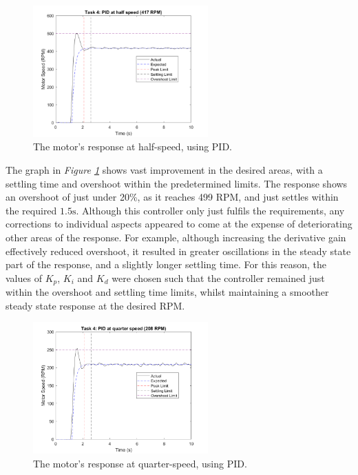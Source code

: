 \documentclass[11pt, onecolumn]{article}
\begin{document}
\begin{figure}[h!]
    \centering
    \includegraphics[width=0.6\textwidth]{q4-pid2.png}
    \caption{The motor's response at half-speed, using PID.}
    \label{fig:q4-pid2}
\end{figure}
\par The graph in \textit{Figure \ref{fig:q4-pid2}} shows vast improvement in the desired areas, with a settling time and overshoot within the predetermined limits. The response shows an overshoot of just under 20\%, as it reaches 499 RPM, and just settles within the required $1.5 \text{s}$. Although this controller only just fulfils the requirements, any corrections to individual aspects appeared to come at the expense of deteriorating other areas of the response. For example, although increasing the derivative gain effectively reduced overshoot, it resulted in greater oscillations in the steady state part of the response, and a slightly longer settling time. For this reason, the values of $K_p$, $K_i$ and $K_d$ were chosen such that the controller remained just within the overshoot and settling time limits, whilst maintaining a smoother steady state response at the desired RPM.
\begin{figure}[h!]
    \centering
    \includegraphics[width=0.6\textwidth]{q4-pid3.png}
    \caption{The motor's response at quarter-speed, using PID.}
    \label{fig:q4-pid3}
\end{figure}
\end{document}
